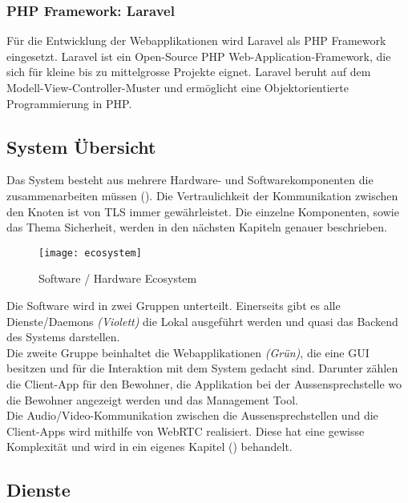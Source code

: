 \subsubsection{PHP Framework: Laravel}
Für die Entwicklung der Webapplikationen wird Laravel als PHP Framework eingesetzt. Laravel ist ein Open-Source PHP Web-Application-Framework, die sich für kleine bis zu mittelgrosse Projekte eignet. Laravel beruht auf dem Modell-View-Controller-Muster und ermöglicht eine Objektorientierte Programmierung in PHP.

\subsection{System Übersicht}
Das System besteht aus mehrere Hardware- und Softwarekomponenten die zusammenarbeiten müssen (). Die  Vertraulichkeit der Kommunikation zwischen den Knoten ist von TLS immer gewährleistet. Die einzelne Komponenten, sowie das Thema Sicherheit, werden in den nächsten Kapiteln genauer beschrieben.

\begin{figure}[htb!]
	\begin{center}
		\texttt{[image: ecosystem]}
		\caption[Software / Hardware Ecosystem]{Software / Hardware Ecosystem}
		\label{fig:echosystem}
	\end{center}
\end{figure}

Die Software wird in zwei Gruppen unterteilt. Einerseits gibt es alle Dienste/Daemons \textit{(Violett)} die Lokal ausgeführt werden und quasi das Backend des Systems darstellen.
\\
Die zweite Gruppe beinhaltet die Webapplikationen \textit{(Grün)}, die eine GUI besitzen und für die Interaktion mit dem System gedacht sind. Darunter zählen die Client-App für den Bewohner, die Applikation bei der Aussensprechstelle wo die Bewohner angezeigt werden und das Management Tool.
\\
Die Audio/Video-Kommunikation zwischen die Aussensprechstellen und die Client-Apps wird mithilfe von WebRTC realisiert. Diese hat eine gewisse Komplexität und wird in ein eigenes Kapitel () behandelt.

\subsection{Dienste}
\label{kap:dienste}


